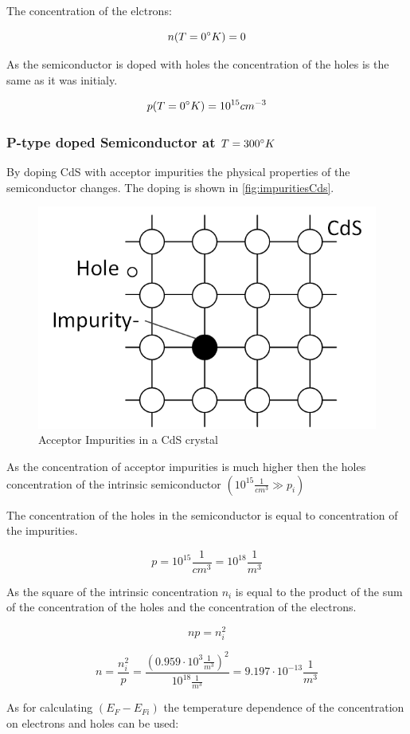 The concentration of the elctrons:

$$n(T=0 \degree K) = 0$$

As the semiconductor is doped with holes the concentration of the
holes is the same as it was initialy.

$$p(T=0 \degree K) = 10^{15}cm^{-3}$$


\subsubsection*{P-type doped Semiconductor at $T=300\degree K$}

By doping CdS with acceptor impurities the physical properties of the
semiconductor changes. The doping is shown in  \autoref{fig:impuritiesCds}.

\begin{figure}[H]
  \centering
  \includegraphics[width=0.5\linewidth]{Graphics/Chapter3/impurity_Cds.png}
  \caption{Acceptor Impurities in a CdS crystal}
  \label{fig:impuritiesCds}
\end{figure}

As the concentration of acceptor impurities is much higher then
the holes concentration of the intrinsic semiconductor 
$(10^{15} \frac{1}{cm^3} \gg p_i)$

The concentration of the holes in the semiconductor is equal to concentration
of the impurities.

$$p = 10^{15} \frac{1}{cm^3} = 10^{18} \frac{1}{m^3}$$

As the square of the intrinsic concentration $n_i$ is equal to the product
of the sum of the concentration of the holes and the concentration of the
electrons.

$$np = n_i^2$$

$$n = \frac{n_i^2}{p} = \frac{(0.959 \cdot 10^3 \frac{1}{m^3})^2}{10^{18} \frac{1}{m^3}} = 9.197 \cdot 10^{-13} \frac{1}{m^3}$$

As for calculating $(E_F-E_{Fi})$ the temperature dependence of the
concentration on electrons and holes can be used:

